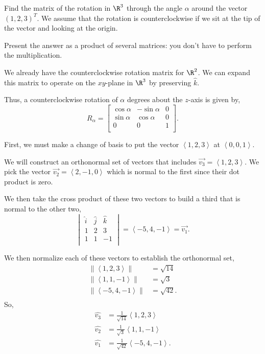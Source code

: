 \documentclass{article}
\begin{document}
Find the matrix of the rotation in $\R^{3}$ through the angle $\alpha$ around the vector ${(1,2,3)}^{T}$.
We assume that the rotation is counterclockwise if we sit at the tip of the vector and looking at the origin.

Present the answer as a product of several matrices: you don't have to perform the multiplication.

We already have the counterclockwise rotation matrix for $\R^{2 }$. We can expand this matrix to operate on the $xy$-plane in $\R^{3 }$ by preserving $\hat{k}$. 

Thus, a counterclockwise rotation of $\alpha$ degrees about the $z $-axis is given by,
\[
  R_{\alpha} = \begin{bmatrix} 
    \cos\alpha & -\sin\alpha & 0 \\
    \sin\alpha & \cos\alpha & 0 \\
    0 & 0 & 1 \\
  \end{bmatrix} 
.\] 

First, we must make a change of basis to put the vector $\left< 1,2,3 \right>$ at $\left<0,0,1 \right>$. 

We will construct an orthonormal set of vectors that includes $\vec{v_3}=\left<1,2,3 \right>$. We pick the vector $\vec{v_2}=\left<2,-1,0 \right>$ which is normal to the first since their dot product is zero. 

We then take the cross product of these two vectors to build a third that is normal to the other two,
\[
  \begin{vmatrix} 
    \hat{i} & \hat{j} & \hat{k} \\
    1 & 2 & 3 \\
    1 & 1 & -1 \\
  \end{vmatrix} = \left< -5, 4, -1 \right> = \vec{v_1} 
.\] 

We then normalize each of these vectors to establish the orthonormal set,
\begin{align*}
  \|\left<1,2,3  \right>\| &= \sqrt{14} \\
  \|\left<1,1,-1  \right>\|&= \sqrt{3}  \\
  \|\left<-5,4,-1 \right>\| &= \sqrt{42}.  \\
\end{align*}
So, 
\begin{align*}
  \hat{v_3} &= \frac{1}{\sqrt{14} }\left<1,2,3\right> \\
  \hat{v_2} &= \frac{1}{\sqrt{3 }}\left<1,1,-1\right> \\
  \hat{v_1} &= \frac{1}{\sqrt{42}}\left<-5,4,-1\right>. \\
\end{align*}
\end{document}
